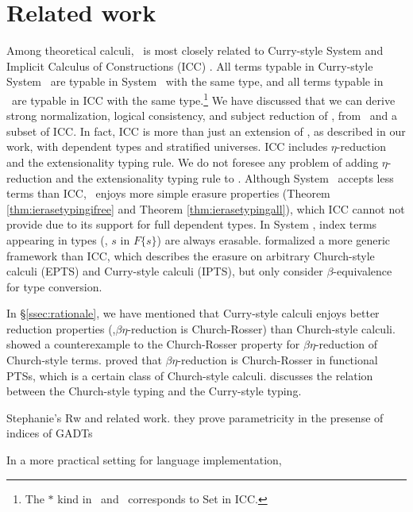 \section{Related work}
\label{sec:relwork}
Among theoretical calculi, \Fi\ is most closely related to
Curry-style System \Fw \cite{AbeMatUus03,AbeMatUus05,GHR93}
and Implicit Calculus of Constructions (ICC) \cite{Miquel01}.
All terms typable in Curry-style System \Fw\ are typable in System \Fi\ 
with the same type, and all terms typable in \Fi\ are typable in ICC
with the same type.\footnote{The $*$ kind in \Fw\ and \Fi\ corresponds
	to \textsf{Set} in ICC.}
We have discussed that we can derive strong normalization, logical consistency,
and subject reduction of \Fi, from \Fw\ and a subset of ICC.
In fact, ICC is more than just an extension of \Fi, as described in our work,
with dependent types and stratified universes. ICC includes $\eta$-reduction
and the extensionality typing rule. We do not foresee any problem of adding
$\eta$-reduction and the extensionality typing rule to \Fi. Although
System \Fi\ accepts less terms than ICC, \Fi\ enjoys more simple
erasure properties (Theorem \ref{thm:ierasetypingifree} and
Theorem \ref{thm:ierasetypingall}), which ICC cannot not provide
due to its support for full dependent types. In System \Fi, index terms
appearing in types (\eg, $s$ in $F\{s\}$) are always erasable.
\citet{LingerS08} formalized a more generic framework than ICC, which describes
the erasure on arbitrary Church-style calculi (EPTS) and Curry-style calculi
(IPTS), but only consider $\beta$-equivalence for type conversion.

In \S\ref{ssec:rationale}, we have mentioned that Curry-style calculi enjoys
better reduction properties (\eg,$\beta\eta$-reduction is Church-Rosser)
than Church-style calculi. \citet{Nederpelt73} showed a counterexample to
the Church-Rosser property for $\beta\eta$-reduction of Church-style terms.
\citet{Geuvers92} proved that $\beta\eta$-reduction is Church-Rosser
in functional PTSs, which is a certain class of Church-style calculi.
\citet{Seldin08} discusses the relation between the Church-style typing
and the Curry-style typing.

Stephanie's Rw and related work.
they prove parametricity in the presense of indices of GADTs

In a more practical setting for language implementation,

